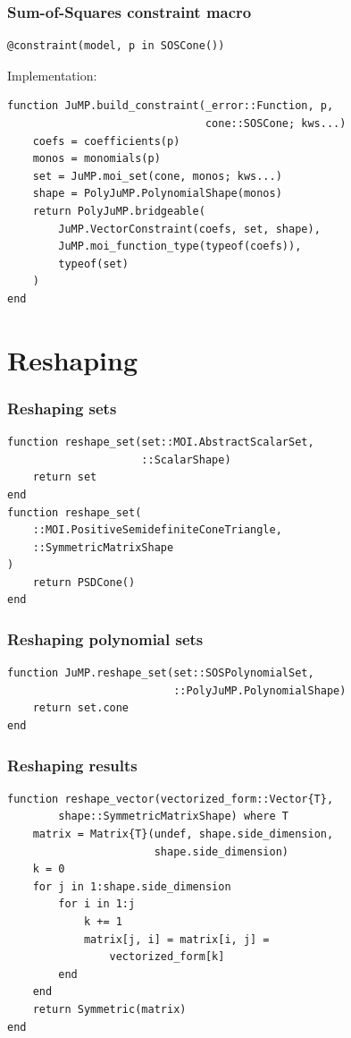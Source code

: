 \documentclass{beamer}
\begin{document}
\begin{frame}[fragile]
  \frametitle{Sum-of-Squares constraint macro}
\begin{verbatim}
@constraint(model, p in SOSCone())
\end{verbatim}
  Implementation:
\begin{verbatim}
function JuMP.build_constraint(_error::Function, p,
                               cone::SOSCone; kws...)
    coefs = coefficients(p)
    monos = monomials(p)
    set = JuMP.moi_set(cone, monos; kws...)
    shape = PolyJuMP.PolynomialShape(monos)
    return PolyJuMP.bridgeable(
        JuMP.VectorConstraint(coefs, set, shape),
        JuMP.moi_function_type(typeof(coefs)),
        typeof(set)
    )
end
\end{verbatim}
\end{frame}

\section{Reshaping}

\begin{frame}[fragile]
  \frametitle{Reshaping sets}
\begin{verbatim}
function reshape_set(set::MOI.AbstractScalarSet,
                     ::ScalarShape)
    return set
end
function reshape_set(
    ::MOI.PositiveSemidefiniteConeTriangle,
    ::SymmetricMatrixShape
)
    return PSDCone()
end
\end{verbatim}
\end{frame}

\begin{frame}[fragile]
  \frametitle{Reshaping polynomial sets}
\begin{verbatim}
function JuMP.reshape_set(set::SOSPolynomialSet,
                          ::PolyJuMP.PolynomialShape)
    return set.cone
end
\end{verbatim}
\end{frame}

\begin{frame}[fragile]
  \frametitle{Reshaping results}
\begin{verbatim}
function reshape_vector(vectorized_form::Vector{T},
        shape::SymmetricMatrixShape) where T
    matrix = Matrix{T}(undef, shape.side_dimension,
                       shape.side_dimension)
    k = 0
    for j in 1:shape.side_dimension
        for i in 1:j
            k += 1
            matrix[j, i] = matrix[i, j] =
                vectorized_form[k]
        end
    end
    return Symmetric(matrix)
end
\end{verbatim}
\end{frame}
\end{document}

